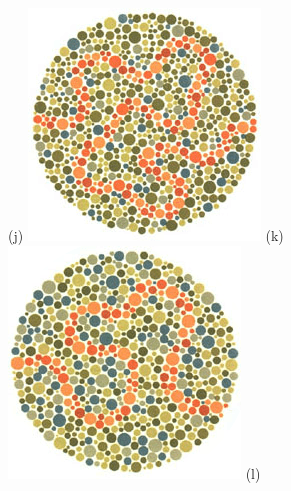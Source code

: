 \documentclass[	12pt, Times, openright, twoside, a4paper, english, brazil]{abntex2}
\begin{document}
\begin{apendicesenv}
\begin{figure}[!htb]
(j)
\endminipage\hfill
{}
\centering
{\includegraphics[width=\linewidth]{ishihara-fuga/plate32.png}}
(k)
\endminipage\hfill
{}
\centering
{\includegraphics[width=\linewidth]{ishihara-fuga/plate33.png}}
(l)


\end{figure}
\end{apendicesenv}
\end{document}

